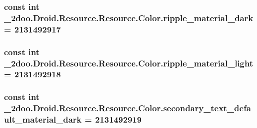 \hypertarget{class__2doo_1_1_droid_1_1_resource_1_1_color_a8e0a34683399566210838dd24ef634b}{
\subsubsection[{ripple\_\-material\_\-dark}]{\setlength{\rightskip}{0pt plus 5cm}const int \_\-2doo.Droid.Resource.Resource.Color.ripple\_\-material\_\-dark = 2131492917}}
\label{class__2doo_1_1_droid_1_1_resource_1_1_color_a8e0a34683399566210838dd24ef634b}


\hypertarget{class__2doo_1_1_droid_1_1_resource_1_1_color_61fe021bd1e00d24b55e6e3c9fa95f10}{
\subsubsection[{ripple\_\-material\_\-light}]{\setlength{\rightskip}{0pt plus 5cm}const int \_\-2doo.Droid.Resource.Resource.Color.ripple\_\-material\_\-light = 2131492918}}
\label{class__2doo_1_1_droid_1_1_resource_1_1_color_61fe021bd1e00d24b55e6e3c9fa95f10}


\hypertarget{class__2doo_1_1_droid_1_1_resource_1_1_color_e13e6852c250576e4a5c5370cab97f12}{
\subsubsection[{secondary\_\-text\_\-default\_\-material\_\-dark}]{\setlength{\rightskip}{0pt plus 5cm}const int \_\-2doo.Droid.Resource.Resource.Color.secondary\_\-text\_\-default\_\-material\_\-dark = 2131492919}}
\label{class__2doo_1_1_droid_1_1_resource_1_1_color_e13e6852c250576e4a5c5370cab97f12}


